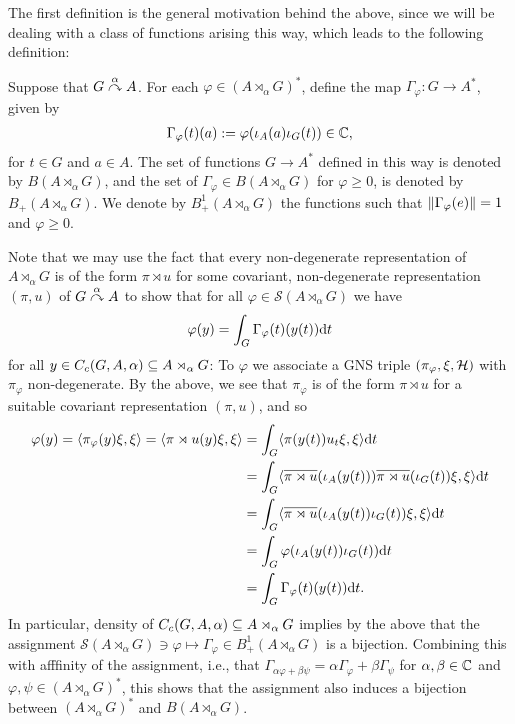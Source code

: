 The first definition is the general motivation behind the above, since we will be dealing with a class of functions arising this way, which leads to the following definition:
\begin{definition}
	Suppose that $G \stackrel{\alpha}{\curvearrowright} A$. For each $\varphi \in (A \rtimes_\alpha G)^*$, define the map $\Gamma_\varphi \colon G \to A^*$, given by
	\begin{align*}
		\Gamma_\varphi(t)(a) :=\varphi(\iota_A(a) \iota_G(t)) \in \mathbb{C},
	\end{align*}
	for $t \in G $ and $a \in A$. The set of functions $G \to A^*$ defined in this way is denoted by $B(A \rtimes_ \alpha G)$, and the set of $\Gamma_\varphi \in B(A \rtimes_ \alpha G)$ for $\varphi \geq 0$,  is denoted by $B_+(A \rtimes_\alpha G)$. We denote by $B_+^1(A \rtimes_\alpha G)$ the functions such that $\left\lVert \Gamma_\varphi (e) \right\rVert = 1$ and $\varphi \geq 0$.
\end{definition}
\begin{remark}
	Note that we may use the fact that every non-degenerate representation of $A \rtimes_\alpha G$ is of the form $\pi \rtimes u$ for some covariant, non-degenerate representation $(\pi,u)$ of $G \stackrel{\alpha}{\curvearrowright} A$ to show that for all $\varphi \in \mathcal{S}(A \rtimes_\alpha G)$ we have
	\begin{align}
		\varphi(y) = \int_G \Gamma_\varphi(t)(y(t)) \mathrm{d} t
		\label{eq:gammafun}
	\end{align}
	for all $y \in C_c(G,A,\alpha) \subseteq A \rtimes_\alpha G$: To $\varphi$ we associate a GNS triple $(\pi_\varphi,\xi, \mathcal{H})$ with $\pi_{\varphi}$ non-degenerate. By the above, we see that $\pi_\varphi$ is of the form $\pi \rtimes u$ for a suitable covariant representation $(\pi,u)$, and so
	\begin{align*}
	\varphi(y) = \langle \pi_\varphi(y) \xi, \xi \rangle = \langle \pi \rtimes u(y) \xi, \xi\rangle &= \int_G \langle \pi(y(t)) u_t \xi, \xi \rangle \mathrm{d} t\\
	&= \int_G \langle \overline{\pi \rtimes u }(\iota_A(y(t))) \overline{\pi \rtimes u } (\iota_G(t)) \xi , \xi \rangle \mathrm{d} t\\
	&= \int_G \langle \overline{\pi \rtimes u} (\iota_A(y(t)) \iota_G(t)) \xi , \xi \rangle\mathrm{d} t\\
	&= \int_G \varphi(\iota_A(y(t)) \iota_G(t)) \mathrm{d} t \\
	&= \int_G \Gamma_\varphi (t) (y(t)) \mathrm{d} t.
	\end{align*}
	In particular, density of $C_c(G,A,\alpha) \subseteq A \rtimes_\alpha G$ implies by the above that the assignment $\mathcal{S}(A \rtimes_\alpha G) \ni \varphi \mapsto \Gamma_\varphi \in B_+^1(A \rtimes_\alpha G)$ is a bijection. Combining this with afffinity of the assignment, i.e., that $\Gamma_{\alpha \varphi + \beta \psi}= \alpha \Gamma_\varphi + \beta \Gamma_\psi$ for $\alpha, \beta \in \mathbb{C}$ and $\varphi, \psi \in (A \rtimes_\alpha G)^*$, this shows that the assignment also induces a bijection between $(A \rtimes_\alpha G )^*$ and $B(A \rtimes_\alpha G)$.
\end{remark}
